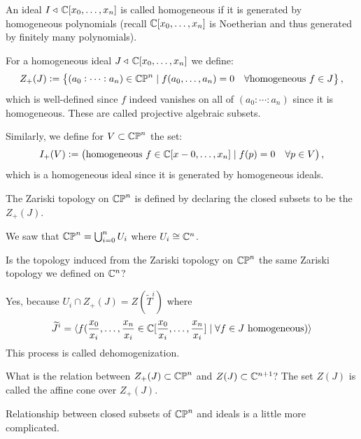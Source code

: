 \documentclass[11pt,a4paper]{article}
\begin{document}
\begin{definition}
  An ideal $I \triangleleft\, \mathbb{C}[x_0,\dots,x_n]$ is called homogeneous
  if it is generated by homogeneous polynomials (recall $\mathbb{C}[x_0,\dots,x_n]$
  is Noetherian and thus generated by finitely many polynomials).

  For a homogeneous ideal $J \triangleleft\, \mathbb{C}[x_0,\dots,x_n]$ we define:
  \[
    Z_+(J) := \left\{(a_0 : \cdots : a_n) \in \mathbb{CP}^n \mid f(a_0,\dots,a_n) = 0
    \quad \forall \text{homogeneous } f \in J\right\},
  \]
  which is well-defined since $f$ indeed vanishes on all of $(a_0 : \cdots : a_n)$
  since it is homogeneous.
  These are called projective algebraic subsets.

  Similarly, we define for $V \subset \mathbb{CP}^n$ the set:
  \[
    I_+(V) := \left(\text{homogeneous } f \in \mathbb{C}[x-0,\dots,x_n] \mid f(p) = 0 \quad \forall p \in V\right),
  \]
  which is a homogeneous ideal since it is generated by homogeneous ideals.
\end{definition}

\begin{remark}
  The Zariski topology on $\mathbb{CP}^n$ is defined by declaring the closed subsets
  to be the $Z_+(J)$.
\end{remark}

\begin{remark}
  We saw that $\mathbb{CP}^n = \bigcup_{i=0}^{n} U_i$ where $U_i \cong \mathbb{C}^n$.
\end{remark}

\begin{question}
  Is the topology induced from the Zariski topology on $\mathbb{CP}^n$ the same
  Zariski topology we defined on $\mathbb{C}^n$?
\end{question}
\begin{answer}
  Yes, because $U_i \cap Z_+(J) = Z(\widetilde T^i)$ where
  \[
    \widetilde J^i = \langle f(\frac{x_0}{x_i},\dots,\frac{x_n}{x_i} \in
    \mathbb{C}[\frac{x_0}{x_i},\dots,\frac{x_n}{x_i}] \mid \forall f \in J \text{ homogeneous})\rangle
  \]
  This process is called dehomogenization.
\end{answer}

\begin{question}
  What is the relation between $Z_+(J) \subset \mathbb{CP}^n$ and $Z(J) \subset \mathbb{C}^{n+1}$?
  The set $Z(J)$ is called the affine cone over $Z_+(J)$.
\end{question}

\begin{remark}
  Relationship between closed subsets of $\mathbb{CP}^n$ and ideals is a little more
  complicated.
\end{remark}
\end{document}
